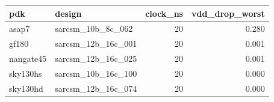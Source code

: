 \begin{tabular}{llrr}
\toprule
pdk & design & clock\_ns & vdd\_drop\_worst \\
\midrule
asap7 & sarcsm\_10b\_8c\_062 & 20 & 0.280 \\
gf180 & sarcsm\_12b\_16c\_001 & 20 & 0.001 \\
nangate45 & sarcsm\_12b\_16c\_025 & 20 & 0.001 \\
sky130hs & sarcsm\_10b\_16c\_100 & 20 & 0.000 \\
sky130hd & sarcsm\_12b\_16c\_074 & 20 & 0.000 \\
\bottomrule
\end{tabular}
